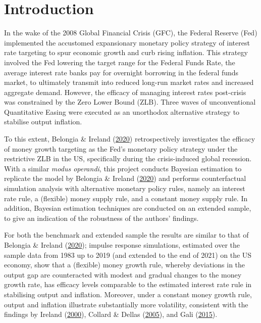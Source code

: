 \documentclass[11pt,preprint, authoryear]{elsarticle}
\numberwithin{equation}{section}
\numberwithin{figure}{section}
\numberwithin{table}{section}
\begin{document}
\pagestyle{fancy}
\chead{}
\rhead{}
\lfoot{}
\lhead{}
\cfoot{}


\headsep 35pt %




\hypertarget{introduction}{%
\section{Introduction}\label{introduction}}

In the wake of the 2008 Global Financial Crisis (GFC), the Federal
Reserve (Fed) implemented the accustomed expansionary monetary policy
strategy of interest rate targeting to spur economic growth and curb
rising inflation. This strategy involved the Fed lowering the target
range for the Federal Funds Rate, the average interest rate banks pay
for overnight borrowing in the federal funds market, to ultimately
transmit into reduced long-run market rates and increased aggregate
demand. However, the efficacy of managing interest rates post-crisis was
constrained by the Zero Lower Bound (ZLB). Three waves of unconventional
Quantitative Easing were executed as an unorthodox alternative strategy
to stabilise output inflation.

To this extent, Belongia \& Ireland
(\protect\hyperlink{ref-belongia2020}{2020}) retrospectively
investigates the efficacy of money growth targeting as the Fed's
monetary policy strategy under the restrictive ZLB in the US,
specifically during the crisis-induced global recession. With a similar
\emph{modus operandi}, this project conducts Bayesian estimation to
replicate the model by Belongia \& Ireland
(\protect\hyperlink{ref-belongia2020}{2020}) and performs counterfactual
simulation analysis with alternative monetary policy rules, namely an
interest rate rule, a (flexible) money supply rule, and a constant money
supply rule. In addition, Bayesian estimation techniques are conducted
on an extended sample, to give an indication of the robustness of the
authors' findings.

For both the benchmark and extended sample the results are similar to
that of Belongia \& Ireland
(\protect\hyperlink{ref-belongia2020}{2020}); impulse response
simulations, estimated over the sample data from 1983 up to 2019 (and
extended to the end of 2021) on the US economy, show that a (flexible)
money growth rule, whereby deviations in the output gap are counteracted
with modest and gradual changes to the money growth rate, has efficacy
levels comparable to the estimated interest rate rule in stabilising
output and inflation. Moreover, under a constant money growth rule,
output and inflation illustrate substantially more volatility,
consistent with the findings by Ireland
(\protect\hyperlink{ref-ireland2000}{2000}), Collard \& Dellas
(\protect\hyperlink{ref-collard2005}{2005}), and Gali
(\protect\hyperlink{ref-gali2015}{2015}).
\end{document}
